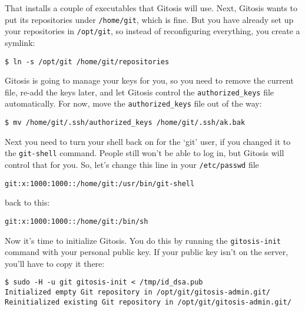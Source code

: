 \documentclass[a4paper]{book}
\newcounter{tab}[chapter]
\begin{document}
That installs a couple of executables that Gitosis will use. Next, Gitosis wants to put its repositories under \texttt{/home/git}, which is fine. But you have already set up your repositories in \texttt{/opt/git}, so instead of reconfiguring everything, you create a symlink:

\begin{shaded}\begin{verbatim}
$ ln -s /opt/git /home/git/repositories
\end{verbatim}\end{shaded}

Gitosis is going to manage your keys for you, so you need to remove the current file, re-add the keys later, and let Gitosis control the \texttt{authorized\_keys} file automatically. For now, move the \texttt{authorized\_keys} file out of the way:

\begin{shaded}\begin{verbatim}
$ mv /home/git/.ssh/authorized_keys /home/git/.ssh/ak.bak
\end{verbatim}\end{shaded}

Next you need to turn your shell back on for the `git' user, if you changed it to the \texttt{git-shell} command. People still won't be able to log in, but Gitosis will control that for you. So, let's change this line in your \texttt{/etc/passwd} file

\begin{shaded}\begin{verbatim}
git:x:1000:1000::/home/git:/usr/bin/git-shell
\end{verbatim}\end{shaded}

back to this:

\begin{shaded}\begin{verbatim}
git:x:1000:1000::/home/git:/bin/sh
\end{verbatim}\end{shaded}

Now it's time to initialize Gitosis. You do this by running the \texttt{gitosis-init} command with your personal public key. If your public key isn't on the server, you'll have to copy it there:

\begin{shaded}\begin{verbatim}
$ sudo -H -u git gitosis-init < /tmp/id_dsa.pub
Initialized empty Git repository in /opt/git/gitosis-admin.git/
Reinitialized existing Git repository in /opt/git/gitosis-admin.git/
\end{verbatim}\end{shaded}
\end{document}
